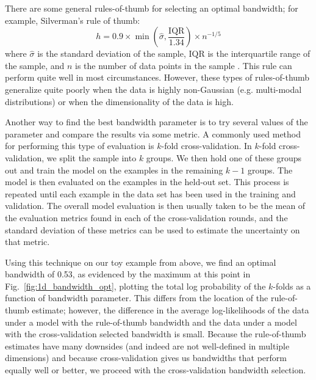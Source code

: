 There are some general rules-of-thumb for selecting an optimal bandwidth; for example, Silverman's rule of thumb:
$$h= 0.9\times\min\left(\hat{\sigma}, \frac{\textrm{IQR}}{1.34}\right) \times n^{-1/5}$$
where $\hat{\sigma}$ is the standard deviation of the sample, $\textrm{IQR}$ is the interquartile range of the sample, and $n$ is the number of data points in the sample \citep{silverman_density_1986}. This rule can perform quite well in most circumstances. However, these types of rules-of-thumb generalize quite poorly when the data is highly non-Gaussian (e.g. multi-modal distributions) or when the dimensionality of the data is high.

Another way to find the best bandwidth parameter is to try several values of the parameter and compare the results via some metric. A commonly used method for performing this type of evaluation is $k$-fold cross-validation. In $k$-fold cross-validation, we split the sample into $k$ groups. We then hold one of these groups out and train the model on the examples in the remaining $k-1$ groups. The model is then evaluated on the examples in the held-out set. This process is repeated until each example in the data set has been used in the training and validation. The overall model evaluation is then usually taken to be the mean of the evaluation metrics found in each of the cross-validation rounds, and the standard deviation of these metrics can be used to estimate the uncertainty on that metric.

Using this technique on our toy example from above, we find an optimal bandwidth of 0.53, as evidenced by the maximum at this point in Fig.~\ref{fig:1d_bandwidth_opt}, plotting the total log probability of the $k$-folds as a function of bandwidth parameter. This differs from the location of the rule-of-thumb estimate; however, the difference in the average log-likelihoods of the data under a model with the rule-of-thumb bandwidth and the data under a model with the cross-validation selected bandwidth is small. Because the rule-of-thumb estimates have many downsides (and indeed are not well-defined in multiple dimensions) and because cross-validation gives us bandwidths that perform equally well or better, we proceed with the cross-validation bandwidth selection.

